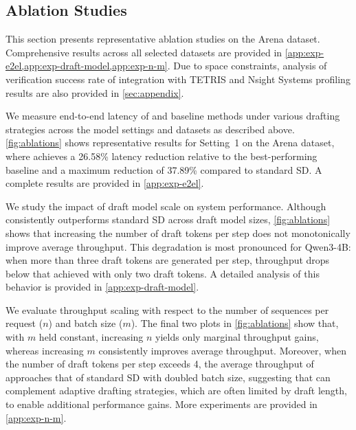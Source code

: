 \subsection{Ablation Studies}
\label{subsec:ablations}
This section presents representative ablation studies on the Arena dataset. Comprehensive results across all selected datasets are provided in \cref{app:exp-e2el,app:exp-draft-model,app:exp-n-m}. Due to space constraints, analysis of verification success rate of integration with TETRIS and Nsight Systems profiling results are also provided in \cref{sec:appendix}.


We measure end-to-end latency of \alg{} and baseline methods under various drafting strategies across the model settings and datasets as described above. \cref{fig:ablations} shows representative results for Setting~1 on the Arena dataset, where \alg{} achieves a 26.58\% latency reduction relative to the best-performing baseline and a maximum reduction of 37.89\% compared to standard SD. A complete results are provided in \cref{app:exp-e2el}.


We study the impact of draft model scale on system performance. Although \alg{} consistently outperforms standard SD across draft model sizes, \cref{fig:ablations} shows that increasing the number of draft tokens per step does not monotonically improve average throughput. This degradation is most pronounced for Qwen3-4B: when more than three draft tokens are generated per step, throughput drops below that achieved with only two draft tokens. A detailed analysis of this behavior is provided in \cref{app:exp-draft-model}.


We evaluate throughput scaling with respect to the number of sequences per request ($n$) and batch size ($m$). The final two plots in \cref{fig:ablations} show that, with $m$ held constant, increasing $n$ yields only marginal throughput gains, whereas increasing $m$ consistently improves average throughput. Moreover, when the number of draft tokens per step exceeds 4, the average throughput of \alg{} approaches that of standard SD with doubled batch size, suggesting that \alg{} can complement adaptive drafting strategies, which are often limited by draft length, to enable additional performance gains. More experiments are provided in \cref{app:exp-n-m}.